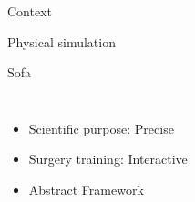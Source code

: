\documentclass[xcolor={usenames,dvipsnames}]{beamer}
\begin{document}
\begin{frame}{Context}
    \begin{block}{Physical simulation}
        \hfill
        \parbox[c][.26\textheight][t]{.98\textwidth}{
        }
    \end{block}
    \pause
    \pause
    \pause
    \pause
    \begin{exampleblock}{Sofa \citep{Allard07SOFA,Nesme09Preserving,Faure11Sparse}}
        \begin{columns}
            \begin{itemize}
                \item<5-> Scientific purpose: \alert<5-6>{Precise}
                \item<6-> Surgery training: \alert<6>{Interactive} 
                \item<8-> \alert<8>{Abstract} Framework
                    \begin{itemize}

\end{itemize}
\end{itemize}
\end{columns}
\end{exampleblock}
\end{frame}
\end{document}
